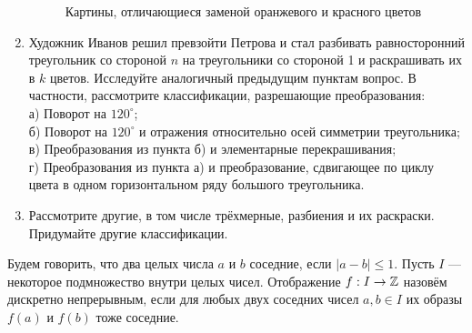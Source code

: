 \begin{enumerate}
\begin{figure}[h]
\begin{center}
\begin{tikzpicture}[ xscale=0.7, yscale=0.7]
\end{tikzpicture}
\end{center}
\caption{Картины, отличающиеся заменой оранжевого и красного цветов}
\end{figure}
\item Художник Иванов решил превзойти Петрова и стал разбивать равносторонний треугольник со стороной $n$ на треугольники со стороной 1 и раскрашивать их в $k$ цветов. Исследуйте аналогичный предыдущим пунктам вопрос. В частности, рассмотрите классификации, разрешающие преобразования: \\
а) Поворот на $120^{\circ}$;\\
б) Поворот на $120^{\circ}$ и отражения относительно осей симметрии треугольника;\\
в) Преобразования из пункта б) и элементарные перекрашивания;\\
г) Преобразования из пункта а) и преобразование, сдвигающее по циклу цвета в одном горизонтальном ряду большого треугольника.
\item Рассмотрите другие, в том числе трёхмерные, разбиения и их раскраски. Придумайте другие классификации.

\end{enumerate}



 Будем говорить, что два целых числа $a$ и $b$ соседние, если $|a-b|\leq 1$. Пусть $I$ --- некоторое подмножество внутри целых чисел. Отображение $f:I\to \mb Z$ назовём дискретно непрерывным, если для любых двух соседних чисел $a,b\in I$ их образы $f(a)$ и $f(b)$ тоже соседние. 

